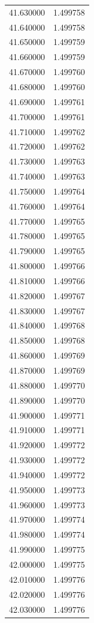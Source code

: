 \begin{tabular}{rr}
41.630000 & 1.499758 \\
41.640000 & 1.499758 \\
41.650000 & 1.499759 \\
41.660000 & 1.499759 \\
41.670000 & 1.499760 \\
41.680000 & 1.499760 \\
41.690000 & 1.499761 \\
41.700000 & 1.499761 \\
41.710000 & 1.499762 \\
41.720000 & 1.499762 \\
41.730000 & 1.499763 \\
41.740000 & 1.499763 \\
41.750000 & 1.499764 \\
41.760000 & 1.499764 \\
41.770000 & 1.499765 \\
41.780000 & 1.499765 \\
41.790000 & 1.499765 \\
41.800000 & 1.499766 \\
41.810000 & 1.499766 \\
41.820000 & 1.499767 \\
41.830000 & 1.499767 \\
41.840000 & 1.499768 \\
41.850000 & 1.499768 \\
41.860000 & 1.499769 \\
41.870000 & 1.499769 \\
41.880000 & 1.499770 \\
41.890000 & 1.499770 \\
41.900000 & 1.499771 \\
41.910000 & 1.499771 \\
41.920000 & 1.499772 \\
41.930000 & 1.499772 \\
41.940000 & 1.499772 \\
41.950000 & 1.499773 \\
41.960000 & 1.499773 \\
41.970000 & 1.499774 \\
41.980000 & 1.499774 \\
41.990000 & 1.499775 \\
42.000000 & 1.499775 \\
42.010000 & 1.499776 \\
42.020000 & 1.499776 \\
42.030000 & 1.499776 \\

\end{tabular}

